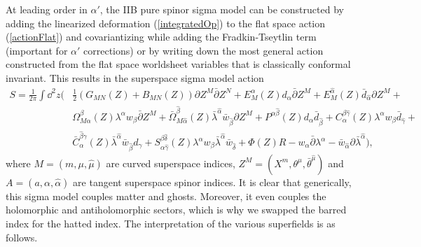 \documentclass[12pt]{article}
\def\be{\begin{equation}}
\def\ee{\end{equation}}
\numberwithin{equation}{section}
\begin{document}
At leading order in $\alpha'$, the IIB pure spinor sigma model can be constructed by adding the linearized deformation (\ref{integratedOp}) to the flat space action (\ref{actionFlat}) and covariantizing while adding the Fradkin-Tseytlin term (important for $\alpha'$ corrections) or by writing down the most general action constructed from the flat space worldsheet variables that is classically conformal invariant. This results in the superspace sigma model action
\be
\begin{aligned}
	\label{sigmaS}
	S = \frac{1}{2\pi}\int \dd^2 z \Big(& \frac{1}{2}(G_{MN}(Z) + B_{MN}(Z))\partial Z^M \bar{\partial}Z^N +  E^\alpha_M(Z) d_\alpha \bar{\partial} Z^M + E^{\hat{\alpha}}_M(Z) \bar{d}_{\hat{\alpha}} \partial Z^M + \\& \Omega_{M\alpha}^\beta(Z) \lambda^\alpha w_\beta \bar{\partial} Z^M + \bar{\Omega}_{M\hat{\alpha}}^{\hat{\beta}}(Z) \bar{\lambda}^{\hat{\alpha}} \bar{w}_{\hat{\beta}} \partial Z^M + P^{\alpha \hat{\beta}}(Z) d_\alpha \bar{d}_{\hat{\beta}} + C_\alpha^{\beta \hat{\gamma}}(Z) \lambda^\alpha w_\beta \bar{d}_{\hat{\gamma}} + \\&\bar{C}_\alpha^{\hat{\beta} \gamma}(Z) \bar{\lambda}^{\hat{\alpha}} \bar{w}_{\hat{\beta}} d_\gamma +  S^{\beta \hat{\delta}}_{\alpha \hat{\gamma}}(Z) \lambda^\alpha w_\beta \bar{\lambda}^{\hat{\alpha}} \bar{w}_{\hat{\delta}} + \Phi(Z) R - w_\alpha \bar{\partial} \lambda^\alpha - \bar{w}_{\hat{\alpha}} \partial \bar{\lambda}^{\hat{\alpha}} \Big),
\end{aligned}
\ee
where $M = (m, \mu, \hat{\mu})$ are curved superspace indices, $Z^M = (X^m, \theta^\mu, \bar{\theta}^{\hat{\mu}})$ and $A=(a, \alpha, \hat{\alpha})$ are tangent superspace spinor indices. It is clear that generically, this sigma model couples matter and ghosts. Moreover, it even couples the holomorphic and antiholomorphic sectors, which is why we swapped the barred index for the hatted index. The interpretation of the various superfields is as follows.
\end{document}
